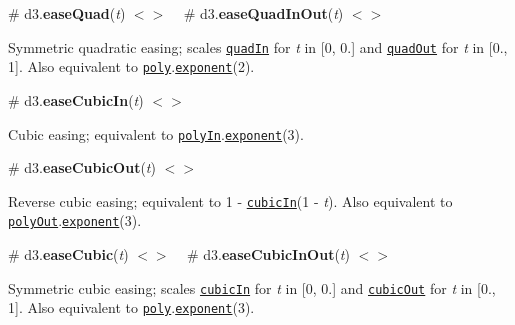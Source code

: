 \label{_easeQuad}%
\# d3.{\bfseries ease\+Quad}({\itshape t}) \href{https://github.com/d3/d3-ease/blob/master/src/quad.js}{\tt $<$$>$} ~\newline
\label{_easeQuadInOut}%
\# d3.{\bfseries ease\+Quad\+In\+Out}({\itshape t}) \href{https://github.com/d3/d3-ease/blob/master/src/quad.js#L9}{\tt $<$$>$}

Symmetric quadratic easing; scales \href{#easeQuadIn}{\tt quad\+In} for {\itshape t} in \mbox{[}0, 0.\mbox{]} and \href{#easeQuadOut}{\tt quad\+Out} for {\itshape t} in \mbox{[}0., 1\mbox{]}. Also equivalent to \href{#easePoly}{\tt poly}.\href{#poly_exponent}{\tt exponent}(2).

\href{http://bl.ocks.org/mbostock/248bac3b8e354a9103c4/#quadInOut}{\tt }

\label{_easeCubicIn}%
\# d3.{\bfseries ease\+Cubic\+In}({\itshape t}) \href{https://github.com/d3/d3-ease/blob/master/src/cubic.js#L1}{\tt $<$$>$}

Cubic easing; equivalent to \href{#easePolyIn}{\tt poly\+In}.\href{#poly_exponent}{\tt exponent}(3).

\href{http://bl.ocks.org/mbostock/248bac3b8e354a9103c4/#cubicIn}{\tt }

\label{_easeCubicOut}%
\# d3.{\bfseries ease\+Cubic\+Out}({\itshape t}) \href{https://github.com/d3/d3-ease/blob/master/src/cubic.js#L5}{\tt $<$$>$}

Reverse cubic easing; equivalent to 1 -\/ \href{#easeCubicIn}{\tt cubic\+In}(1 -\/ {\itshape t}). Also equivalent to \href{#easePolyOut}{\tt poly\+Out}.\href{#poly_exponent}{\tt exponent}(3).

\href{http://bl.ocks.org/mbostock/248bac3b8e354a9103c4/#cubicOut}{\tt }

\label{_easeCubic}%
\# d3.{\bfseries ease\+Cubic}({\itshape t}) \href{https://github.com/d3/d3-ease/blob/master/src/cubic.js}{\tt $<$$>$} ~\newline
\label{_easeCubicInOut}%
\# d3.{\bfseries ease\+Cubic\+In\+Out}({\itshape t}) \href{https://github.com/d3/d3-ease/blob/master/src/cubic.js#L9}{\tt $<$$>$}

Symmetric cubic easing; scales \href{#easeCubicIn}{\tt cubic\+In} for {\itshape t} in \mbox{[}0, 0.\mbox{]} and \href{#easeCubicOut}{\tt cubic\+Out} for {\itshape t} in \mbox{[}0., 1\mbox{]}. Also equivalent to \href{#easePoly}{\tt poly}.\href{#poly_exponent}{\tt exponent}(3).

\href{http://bl.ocks.org/mbostock/248bac3b8e354a9103c4/#cubicInOut}{\tt }

